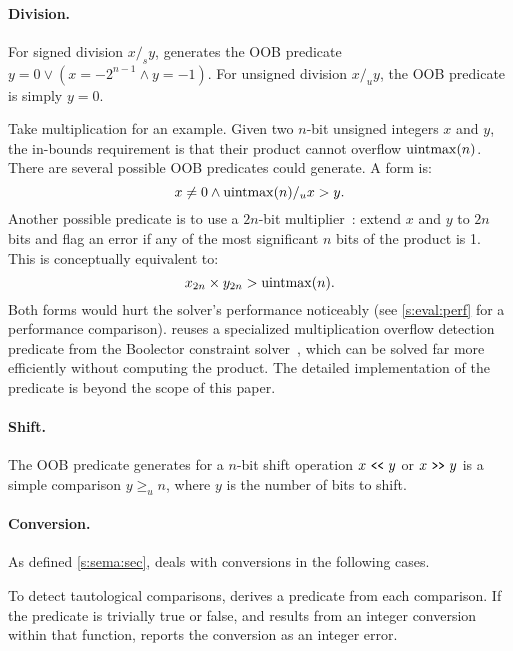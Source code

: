 \paragraph{Division.}
For signed division $x /_s y$, \sys generates the OOB predicate
$y = 0 \lor (x = -2^{n-1} \land y = -1)$.
For unsigned division $x /_u y$, the OOB predicate is simply
$y = 0$.

Take multiplication for an example.  Given two $n$-bit unsigned
integers $x$ and $y$, the in-bounds requirement is that their product
cannot overflow $\operatorname{uintmax}(n)$.  There are several possible OOB
predicates \sys could generate.
A \naive form is:
\begin{equation*}
x \neq 0 \land \operatorname{uintmax}(n) /_u x > y.
\end{equation*}
Another possible predicate is to use a $2n$-bit
multiplier~\cite{molnar:catchconv}: extend $x$ and $y$ to $2n$ bits
and flag an error if any of the most significant $n$ bits of the
product is 1.  This is conceptually equivalent to:
\begin{equation*}
x_{2n} \times y_{2n} > \operatorname{uintmax}(n).
\end{equation*}
Both forms would hurt the solver's performance noticeably
(see \autoref{s:eval:perf} for a performance comparison).
%
\sys reuses a specialized multiplication overflow detection predicate
from the Boolector constraint
solver~\cite[\chapterautorefname~3.5]{brummayer:phd}, which can be
solved far more efficiently without computing the product.  The
detailed implementation of the predicate is beyond the scope of
this paper.
\fi

\paragraph{Shift.}
The OOB predicate \sys generates for a $n$-bit shift operation
$x \shl y$ or $x \shr y$ is a simple comparison $y \geq_u n$, where
$y$ is the number of bits to shift.

\paragraph{Conversion.}
As defined \autoref{s:sema:sec}, \sys deals with conversions
in the following cases.

To detect tautological comparisons, \sys derives a predicate from
each comparison.  If the predicate is trivially true or false,
and results from an integer conversion within that function, \sys
reports the conversion as an integer error.

